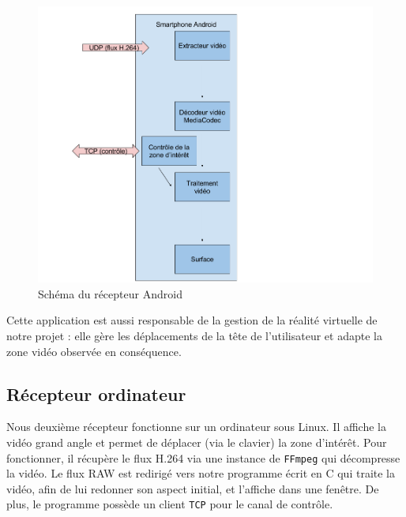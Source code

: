 \documentclass[11pt,a4paper]{article}
\begin{document}
\bigbreak
\begin{figure}[H]
\begin{center}
\includegraphics[scale=0.35]{images/schema_recepteur_android.png}
\end{center}
\caption{Schéma du récepteur Android}
\label{}
\end{figure}

\bigbreak
Cette application est aussi responsable de la gestion de la réalité virtuelle de notre projet : elle gère les déplacements de la tête de l'utilisateur et adapte la zone vidéo observée en conséquence.

\subsection{Récepteur ordinateur}
Nous deuxième récepteur fonctionne sur un ordinateur sous Linux. Il affiche la vidéo grand angle et permet de déplacer (via le clavier) la zone d'intérêt.
Pour fonctionner, il récupère le flux H.264 via une instance de \texttt{FFmpeg} qui décompresse la vidéo.
Le flux RAW est redirigé vers notre programme écrit en C qui traite la vidéo, afin de lui redonner son aspect initial, et l'affiche dans une fenêtre.
De plus, le programme possède un client \texttt{TCP} pour le canal de contrôle.
\end{document}
